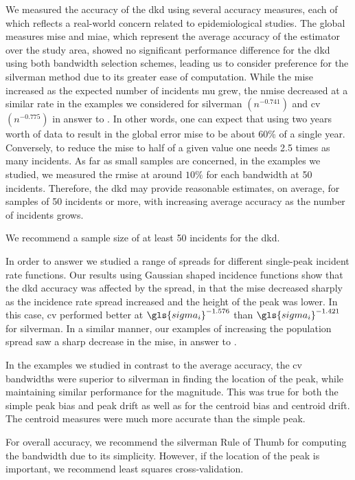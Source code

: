 We measured the accuracy of the \gls{dkd} using several accuracy measures,
each of which reflects a real-world concern related to epidemiological studies.
The global measures \gls{mise} and \gls{miae},
which represent the average accuracy of the estimator over the study area,
showed no significant performance difference
for the \gls{dkd} using both bandwidth selection schemes,
leading us to consider preference for the \gls{silverman} method due to its greater ease of computation.
While the \gls{mise} increased as the expected number of incidents \gls{mu} grew,
the \acrfull{nmise} decreased at a similar rate
in the examples we considered
for \gls{silverman} $(n^{-0.741})$ and \gls{cv} $(n^{-0.775})$ in answer to .
In other words,
one can expect that using two years worth of data
to result in the global error \gls{mise} to be about 60\% of a single year.
Conversely,
to reduce the \gls{mise} to half of a given value
one needs 2.5 times as many incidents.
As far as small samples are concerned,
in the examples we studied,
we measured the \acrfull{rmise} at around $10\%$ for each bandwidth at 50 incidents.
Therefore,
the \gls{dkd} may provide reasonable estimates,
on average,
for samples of 50 incidents or more,
with increasing average accuracy as the number of incidents grows.
\begin{rec}
    \label{rec:small-sample}
    We recommend a sample size of at least 50 incidents for the \gls{dkd}.
\end{rec}

In order to answer  we studied a range of spreads for different single-peak incident rate functions.
Our results using Gaussian shaped incidence functions show that the \gls{dkd} accuracy was affected by the spread,
in that the \gls{mise} decreased sharply
as the incidence rate spread increased and the height of the peak was lower.
In this case,
\gls{cv} performed better at $\gls{sigma_i}^{-1.576}$ than $\gls{sigma_i}^{-1.421}$ for \gls{silverman}.
In a similar manner,
our examples of increasing the population spread saw a sharp decrease in the \gls{mise},
in answer to .

In the examples we studied
in contrast to the average accuracy,
the \gls{cv} bandwidths were superior to \gls{silverman}
in finding the location of the peak,
while maintaining similar performance for the magnitude.
This was true for both the simple \gls{peak bias} and \gls{peak drift} as well as for the
\gls{centroid bias} and \gls{centroid drift}.
The centroid measures were much more accurate than the simple peak.
\begin{rec}
    \label{rec:bandwidth-scheme}
    For overall accuracy, we recommend the \gls{silverman} Rule of Thumb for computing the bandwidth due to its simplicity.
    However, if the location of the peak is important, we recommend least squares cross-validation.
\end{rec}

